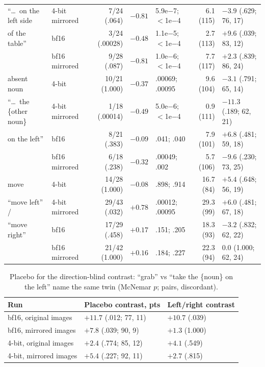\documentclass[conference]{IEEEtran}
\begin{document}
\begin{table}[t]
\begin{tabular}{@{}l l r r l r l@{}}
``\dots\ on the left side & 4-bit mirrored & 7/24 (.064) & $-0.81$ & 5.9e$-$7; $<$1e$-$4 & 6.1 (115) & $-3.9$ (.629; 76, 17)\\
of the table'' & bf16 & 3/24 (.00028) & $-0.48$ & 1.1e$-$5; $<$1e$-$4 & 2.7 (113) & $+9.6$ (.039; 83, 12)\\
 & bf16 mirrored & 9/28 (.087) & $-0.81$ & 1.0e$-$6; $<$1e$-$4 & 7.7 (117) & $+2.3$ (.839; 86, 24)\\
\midrule
absent noun & 4-bit & 10/21 (1.000) & $-0.37$ & .00069; .00095 & 9.6 (104) & $-3.1$ (.791; 65, 14)\\
``\dots\ the \{other noun\} & 4-bit mirrored & 1/18 (.00014) & $-0.49$ & 5.0e$-$6; $<$1e$-$4 & 0.9 (111) & $-11.3$ (.189; 62, 21)\\
on the left'' & bf16 & 8/21 (.383) & $-0.09$ & .041; .040 & 7.9 (101) & $+6.8$ (.481; 59, 18)\\
 & bf16 mirrored & 6/18 (.238) & $-0.32$ & .00049; .002 & 5.7 (106) & $-9.6$ (.230; 73, 25)\\
\midrule
move & 4-bit & 14/28 (1.000) & $-0.08$ & .898; .914 & 16.7 (84) & $+5.4$ (.648; 56, 19)\\
``move left'' / & 4-bit mirrored & 29/43 (.032) & $+0.78$ & .00012; .00095 & 29.3 (99) & $+6.0$ (.481; 67, 18)\\
``move right'' & bf16 & 17/29 (.458) & $+0.17$ & .151; .205 & 18.3 (93) & $-3.2$ (.832; 62, 22)\\
 & bf16 mirrored & 21/42 (1.000) & $+0.16$ & .184; .227 & 22.3 (94) & $0.0$ (1.000; 62, 24)\\
\bottomrule
\end{tabular}
\end{table}

\begin{table}[t]
\centering
\scriptsize
\setlength{\tabcolsep}{2.5pt}
\caption{Placebo for the direction-blind contrast: ``grab'' vs ``take the \{noun\} on the left'' name the same twin (McNemar $p$; pairs, discordant).}
\label{tab:placebo}
\begin{tabular}{@{}l l l@{}}
\toprule
Run & Placebo contrast, pts & Left/right contrast\\
\midrule
bf16, original images & $+11.7$ (.012; 77, 11) & $+10.7$ (.039)\\
bf16, mirrored images & $+7.8$ (.039; 90, 9) & $+1.3$ (1.000)\\
4-bit, original images & $+2.4$ (.774; 85, 12) & $+4.1$ (.549)\\
4-bit, mirrored images & $+5.4$ (.227; 92, 11) & $+2.7$ (.815)\\
\bottomrule
\end{tabular}
\end{table}
\end{document}

